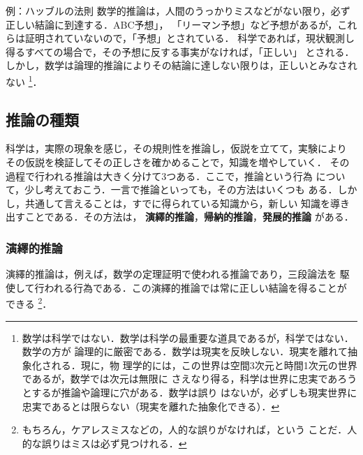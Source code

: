 \begin{memo}{例：ハッブルの法則}
                数学的推論は，人間のうっかりミスなどがない限り，必ず正しい結論に到達する．ABC予想」，
                「リーマン予想」など予想があるが，これらは証明されていないので，「予想」とされている．
                科学であれば，現状観測し得るすべての場合で，その予想に反する事実がなければ，「正しい」
                とされる．しかし，数学は論理的推論によりその結論に達しない限りは，正しいとみなされない
                    \footnote{
                        数学は科学ではない．数学は科学の最重要な道具であるが，科学ではない．数学の方が
                        論理的に厳密である．数学は現実を反映しない．現実を離れて抽象化される．現に，物
                        理学的には，この世界は空間3次元と時間1次元の世界であるが，数学では次元は無限に
                        さえなり得る，科学は世界に忠実であろうとするが推論や論理に穴がある．数学は誤り
                        はないが，必ずしも現実世界に忠実であるとは限らない（現実を離れた抽象化できる）．
                    }．
            \end{memo}

        \subsection{推論の種類}
            科学は，実際の現象を感じ，その規則性を推論し，仮説を立てて，実験により
            その仮説を検証してその正しさを確かめることで，知識を増やしていく．
            その過程で行われる推論は大きく分けて3つある．ここで，推論という行為
            について，少し考えておこう．一言で推論といっても，その方法はいくつも
            ある．しかし，共通して言えることは，すでに得られている知識から，新しい
            知識を導き出すことである．その方法は，
            \textbf{演繹的推論}，\textbf{帰納的推論}，\textbf{発展的推論} がある．

            \subsubsection{演繹的推論}
            演繹的推論は，例えば，数学の定理証明で使われる推論であり，三段論法を
            駆使して行われる行為である．この演繹的推論では常に正しい結論を得ることが
            できる
                \footnote{
                    もちろん，ケアレスミスなどの，人的な誤りがなければ，という
                    ことだ．人的な誤りはミスは必ず見つけれる．
                }．

